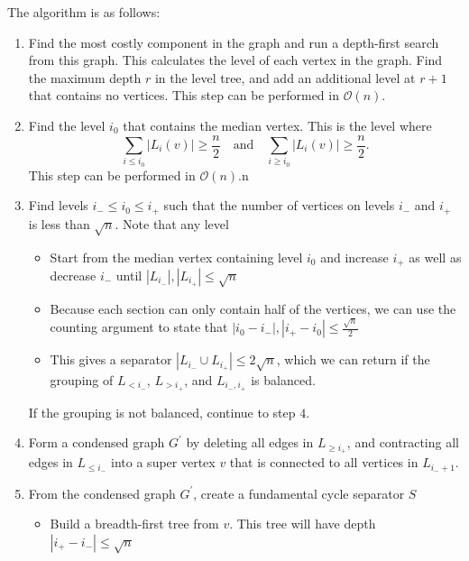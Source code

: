 \documentclass[11pt]{article}
\begin{document}
    The algorithm is as follows:
    \begin{enumerate}

        \item Find the most costly component in the graph and run a depth-first search from this graph. This calculates the level of each vertex in the graph. Find the maximum depth $r$ in the level tree, and add an additional level at $r+1$ that contains no vertices. This step can be performed in $\mathcal{O}(n)$.

        \item Find the level $i_0$ that contains the median vertex. This is the level where
\[
\sum_{i \leq i_0} |L_i(v)| \geq \frac{n}{2} \quad \text{and}\quad \sum_{i \geq i_0} |L_i(v)| \geq \frac{n}{2}.
\]
This step can be performed in $\mathcal{O}(n)$.n

        \item Find levels $i_- \leq i_0 \leq i_+$ such that the number of vertices on levels $i_-$ and $i_+$ is less than $\sqrt{n}$. Note that any level
        \begin{itemize}
            \item Start from the median vertex containing level $i_0$ and increase $i_+$ as well as decrease $i_-$ until $|L_{i_-}|,|L_{i_+}| \leq \sqrt{n}$

            \item Because each section can only contain half of the vertices, we can use the counting argument to state that $|i_0 - i_-|,|i_+ - i_0| \leq \frac{\sqrt{n}}{2}$

            \item This gives a separator $|L_{i_-} \cup L_{i_+}| \leq 2 \sqrt{n}$, which we can return if the grouping of $L_{< i_-}$, $L_{> i_+}$, and $L_{i_-,i_+}$ is balanced.
        \end{itemize}
        If the grouping is not balanced, continue to step $4$.

        \item Form a condensed graph $G^{'}$ by deleting  all edges in $L_{\geq i_+}$, and contracting all edges in $L_{\leq i_-}$ into a super vertex $v$ that is connected to all vertices in $L_{i_- + 1}$.

        \item From the condensed graph $G^{'}$, create a fundamental cycle separator $S$
        \begin{itemize}
            \item Build a breadth-first tree from $v$. This tree will have depth $|i_+ - i_-| \leq \sqrt{n}$


\end{itemize}
\end{enumerate}
\end{document}
